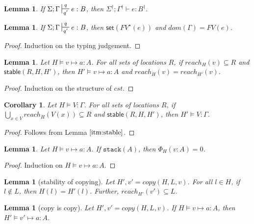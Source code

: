 \documentclass[11pt]{article}
\newcommand{\irl}[1]{\mathtt{#1}}
\newcommand{\stable}[1]{\mathsf{stable}(#1)}
\newcommand{\set}[1]{\mathsf{set}(#1)}
\newcommand{\stack}[1]{\irl{stack}(#1)}
\newtheorem{lemma}[theorem]{Lemma}
\newtheorem{corollary}{Corollary}[theorem]
\theoremstyle{definition}
\begin{document}
\begin{lemma}
\label{a} If $\Sigma; \Gamma \sststile{q'}{q} e : B$, then $\Sigma^{\dagger}; \Gamma^{\dagger} \vdash e : B^{\dagger}$.
\end{lemma}

\begin{lemma}\label{itm:linear}
\label{a} If $\Sigma; \Gamma \sststile{q'}{q} e : B$, then $\set{FV^{\star}(e)}$ and $dom(\Gamma) = FV(e)$.
\end{lemma}

\begin{proof}
Induction on the typing judgement.
\end{proof}

\begin{lemma}\label{itm:stable}
Let $H \vDash v \mapsto a : A$. For all sets of locations $R$, if $reach_H(v) \subseteq R$ and $\stable{R,H,H'}$, then $H' \vDash v \mapsto a : A$ and $reach_H(v) = reach_{H'}(v)$.
\end{lemma}

\begin{proof}
Induction on the structure of $cst$.
\end{proof}

\begin{corollary}
Let $H \vDash V : \Gamma$. For all sets of locations $R$, if $\bigcup_{x \in V} reach_H(V(x)) \subseteq R$ and $\stable{R,H,H'}$, then $H' \vDash V : \Gamma$.
\end{corollary}

\begin{proof}
Follows from Lemma $\ref{itm:stable}$.
\end{proof}

\begin{lemma}\label{itm:stack}
Let $H \vDash v \mapsto a : A$. If $\stack{A}$, then $\Phi_H(v:A) = 0$.
\end{lemma}

\begin{proof}
Induction on $H \vDash v \mapsto a : A$.
\end{proof}


\begin{lemma}[stability of copying]
	Let $H',v' = copy(H,L,v)$. For all $l \in H$, if $l \notin L$, then $H(l) = H'(l)$. 
	Further, $reach_{H'}(v') \subseteq L$.
\end{lemma}

\begin{lemma}[copy is copy]
	Let $H',v' = copy(H,L,v)$. If $H \vDash v \mapsto a : A$, then $H' \vDash v' \mapsto a : A$.
\end{lemma}
\end{document}

